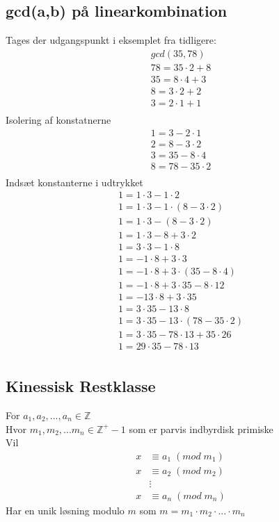 \documentclass[12pt, a4paper]{article}
\begin{document}
		\subsection{gcd(a,b) på linearkombination} 
			Tages der udgangspunkt i eksemplet fra tidligere:
			\begin{align*}
				gcd(35,78)\\
				78=35\cdot 2 +8\\
				35=8\cdot 4+3\\
				8=3\cdot 2 + 2\\
				3=2\cdot 1 +1\\
			\end{align*}
			Isolering af konstatnerne
			\begin{align*}
				1=3-2\cdot 1\\
				2=8-3\cdot 2\\
				3=35-8\cdot 4\\
				8=78-35\cdot 2\\
			\end{align*}
			Indsæt konstanterne i udtrykket
			\begin{align*}
				1=1\cdot 3-1\cdot 2\\
				1=1\cdot 3 - 1\cdot (8-3\cdot 2)\\
				1=1\cdot 3 -(8-3\cdot 2)\\
				1=1\cdot 3 -8+3\cdot 2\\
				1=3\cdot 3 -1\cdot 8\\
				1=-1\cdot 8 + 3\cdot 3\\
				1=-1\cdot 8 + 3\cdot (35-8\cdot 4)\\
				1=-1\cdot 8 + 3\cdot 35 - 8\cdot 12\\
				1=-13\cdot 8 + 3\cdot 35\\
				1=3\cdot 35 - 13\cdot 8\\
				1=3\cdot 35 - 13\cdot (78-35\cdot 2)\\
				1=3\cdot 35 - 78\cdot 13 + 35\cdot 26\\
				1=29\cdot 35 - 78\cdot 13\\
			\end{align*}
		\subsection{Kinessisk Restklasse}
			For $a_1,a_2,...,a_n \in \mathbb{Z}$\\
			Hvor $m_1,m_2,...m_n \in \mathbb{Z}^+-{1}$ som er parvis indbyrdisk primiske\\
			Vil \begin{align*}
				x&\equiv a_1 \;(mod\;m_1)\\
				x&\equiv a_2\; (mod\;m_2)\\
				 &\vdots\\
				x&\equiv a_n \;(mod\;m_n)
			\end{align*}
			Har en unik løsning modulo $m$ som $m=m_1\cdot m_2\cdot ...\cdot m_n$
\end{document}
